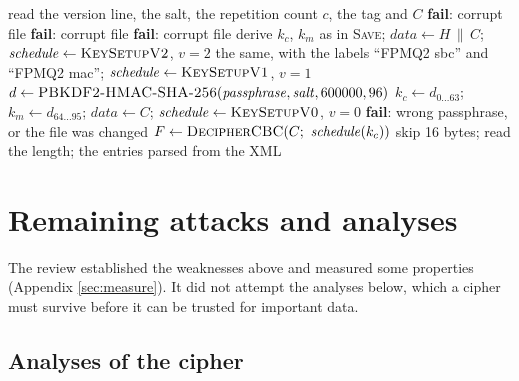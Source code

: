 \begin{algorithm}[htbp]
\caption{Opening the password file (FPMQ1, FPMQ2 or FPMQ3)}
\label{alg:open}
\begin{algorithmic}[1]
  \State read the version line, the salt, the repetition count $c$, the tag and $C$
    \State \textbf{fail}: corrupt file
  \EndIf
   
    \State \textbf{fail}: corrupt file
  \EndIf
    \State \textbf{fail}: corrupt file
  \EndIf
    \State derive $k_c$, $k_m$ as in \textsc{Save}; $\mathit{data} \gets H \,\|\, C$;
           $\mathit{schedule} \gets \textsc{KeySetupV2}$, $v = 2$
    \State the same, with the labels ``FPMQ2 sbc'' and ``FPMQ2 mac'';
           $\mathit{schedule} \gets \textsc{KeySetupV1}$, $v = 1$
  \Else {}
    \State $d \gets \textsc{PBKDF2-HMAC-SHA-256}(\mathit{passphrase}, \mathit{salt}, 600000, 96)$
    \State $k_c \gets d_{0 \ldots 63}$; $k_m \gets d_{64 \ldots 95}$; $\mathit{data} \gets C$;
           $\mathit{schedule} \gets \textsc{KeySetupV0}$, $v = 0$
  \EndIf
    \State \textbf{fail}: wrong passphrase, or the file was changed
  \EndIf
  \State $F \gets \textsc{DecipherCBC}(C;\ \mathit{schedule}(k_c))$
  \State skip 16 bytes; read the length; \Return the entries parsed from the XML
\EndFunction
\end{algorithmic}
\end{algorithm}

\FloatBarrier
\section{Remaining attacks and analyses}
\label{sec:open}

The review established the weaknesses above and measured some properties
(Appendix \ref{sec:measure}). It did not attempt the analyses below, which a
cipher must survive before it can be trusted for important data.

\subsection{Analyses of the cipher}

